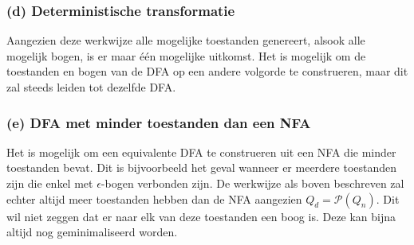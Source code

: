 \subsubsection*{(d) Deterministische transformatie}
Aangezien deze werkwijze alle mogelijke toestanden genereert, alsook alle mogelijk bogen, is er maar \'e\'en mogelijke uitkomst. Het is mogelijk om de toestanden en bogen van de DFA op een andere volgorde te construeren, maar dit zal steeds leiden tot dezelfde DFA.

\subsubsection*{(e) DFA met minder toestanden dan een NFA}

Het is mogelijk om een equivalente DFA te construeren uit een NFA die minder toestanden bevat. Dit is bijvoorbeeld het geval wanneer er meerdere toestanden zijn die enkel met $\epsilon$-bogen verbonden zijn. De werkwijze als boven beschreven zal echter altijd meer toestanden hebben dan de NFA aangezien $Q_d = \mathcal{P}(Q_n)$. Dit wil niet zeggen dat er naar elk van deze toestanden een boog is. Deze kan bijna altijd nog geminimaliseerd worden.